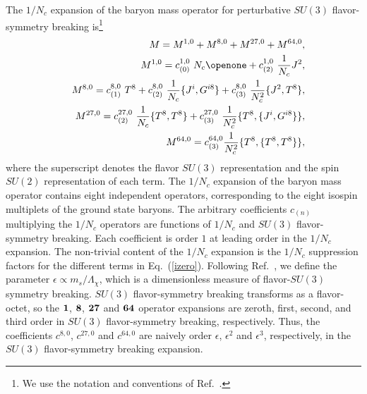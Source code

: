 \documentclass[twocolumn,nofootinbib,prd,aps,superscriptaddress,tightenlines]{revtex4}
\def\N{N_c}
\begin{document}
The $1/N_c$ expansion of the baryon mass operator for perturbative $SU(3)$ flavor-symmetry breaking is\footnote{We use the notation and conventions of Ref.~\cite{jl}.}
\begin{eqnarray}\label{izero}
&&M = M^{1,0} + M^{ 8,0} +  M^{{27},0} + M^{{64},0}, \nonumber\\
&&M^{1,0} =  c_{(0)}^{1,0}\ \N \openone + c_{(2)}^{1,0}\ {1 \over \N }
J^2, \nonumber \\
&&M^{8,0} =  c_{(1)}^{8,0}\ T^8 + c_{(2)}^{8,0}\ {1 \over \N }
\{ J^i, G^{i8} \} + c_{(3)}^{8,0}\ {1 \over \N^2 } \{ J^2, T^8 \},
\nonumber \\
&&M^{{27},0} =   c_{(2)}^{27,0}\ {1 \over \N} \{ T^8, T^8 \}
+  c_{(3)}^{27,0}\ {1 \over \N^2 } \{ T^8, \{ J^i, G^{i8} \}\},
\nonumber \\
&&M^{{64},0} =   c_{(3)}^{64,0} {1 \over \N^2 } \{ T^8, \{ T^8, T^8
\}\},
\end{eqnarray}
where the superscript denotes the flavor $SU(3)$ representation and the spin $SU(2)$ representation of each term.
The $1/N_c$ expansion of the baryon mass operator contains eight independent operators, corresponding to the eight 
isospin multiplets of the ground state baryons.  
The arbitrary coefficients $c_{(n)}$ multiplying the $1/N_c$ operators are functions of $1/N_c$ and $SU(3)$ flavor-symmetry breaking.  Each coefficient is order $1$ at leading order in the $1/N_c$ expansion.    
The non-trivial content of the $1/N_c$ expansion is the $1/N_c$ suppression factors for the different terms in Eq.~(\ref{izero}).
Following Ref.~\cite{jl}, we define the parameter $\epsilon \propto m_s/\Lambda_\chi $, which is a dimensionless measure of flavor-$SU(3)$ symmetry breaking.  
$SU(3)$ flavor-symmetry breaking transforms as a flavor-octet, so the ${\bf 1}$, ${\bf 8}$, ${\bf 27}$ and ${\bf 64}$ operator expansions
are zeroth, first, second, and third order in $SU(3)$ flavor-symmetry breaking, respectively.  Thus, the coefficients $c^{8,0}$, $c^{27,0}$ and $c^{64,0}$ are naively order $\epsilon$, $\epsilon^2$ and $\epsilon^3$, respectively, in the $SU(3)$ flavor-symmetry breaking expansion.
\end{document}
